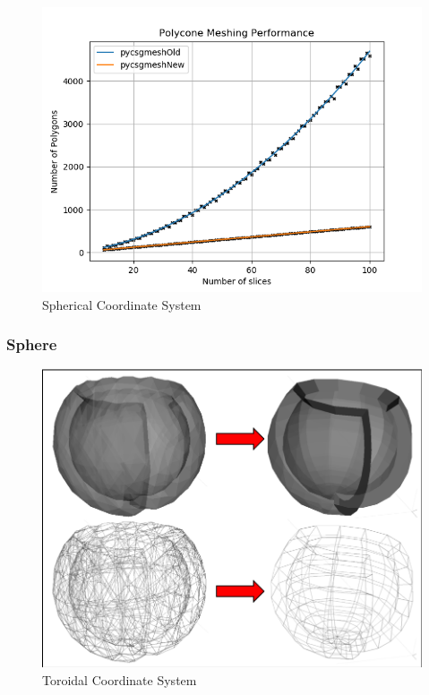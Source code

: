 \documentclass[12pt,a4paper]{article}
\begin{document}
\begin{figure}[h!]
\centering
\includegraphics[scale=0.5]{Images//Quad_fits//Polycone_quad.png}
\caption[width=\columnwidth]{Spherical Coordinate System}
\label{conts}
\end{figure}


\subsubsection{Sphere}

\begin{figure}[h!]
\centering
\includegraphics[scale=0.5]{Images//Meshes//sphere.png}
\caption[width=\columnwidth]{Toroidal Coordinate System}
\label{conts}
\end{figure}
\end{document}
